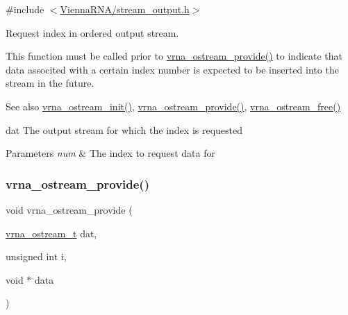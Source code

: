 {\ttfamily \#include $<$\hyperlink{stream__output_8h}{Vienna\+R\+N\+A/stream\+\_\+output.\+h}$>$}



Request index in ordered output stream. 

This function must be called prior to \hyperlink{group__buffer__utils_ga6253c42abdeaf3b41a38204865e1f0f7}{vrna\+\_\+ostream\+\_\+provide()} to indicate that data associted with a certain index number is expected to be inserted into the stream in the future.

\begin{DoxySeeAlso}{See also}
\hyperlink{group__buffer__utils_gad23113e66a0910ec2341856e2da56bf6}{vrna\+\_\+ostream\+\_\+init()}, \hyperlink{group__buffer__utils_ga6253c42abdeaf3b41a38204865e1f0f7}{vrna\+\_\+ostream\+\_\+provide()}, \hyperlink{group__buffer__utils_gaf813ec90e1446ba82c89f9a39688a3b3}{vrna\+\_\+ostream\+\_\+free()}
\end{DoxySeeAlso}
dat The output stream for which the index is requested 
\begin{DoxyParams}{Parameters}
{\em num} & The index to request data for \\
\hline
\end{DoxyParams}
\mbox{\label{group__buffer__utils_ga6253c42abdeaf3b41a38204865e1f0f7}} 
\subsubsection{\texorpdfstring{vrna\+\_\+ostream\+\_\+provide()}{vrna\_ostream\_provide()}}
{\footnotesize\ttfamily void vrna\+\_\+ostream\+\_\+provide (\begin{DoxyParamCaption}\item[{\hyperlink{group__buffer__utils_ga8da189552af21ab6e4e88bdcc240870c}{vrna\+\_\+ostream\+\_\+t}}]{dat,  }\item[{unsigned int}]{i,  }\item[{void $\ast$}]{data }\end{DoxyParamCaption})}



